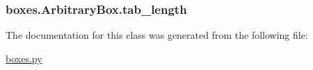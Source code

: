 \subsubsection[{tab\+\_\+length}]{\setlength{\rightskip}{0pt plus 5cm}boxes.\+Arbitrary\+Box.\+tab\+\_\+length}\label{classboxes_1_1_arbitrary_box_aa3f4f131456dc23999d99a422041c842}


The documentation for this class was generated from the following file\+:\begin{DoxyCompactItemize}
\item 
\hyperlink{boxes_8py}{boxes.\+py}\end{DoxyCompactItemize}
